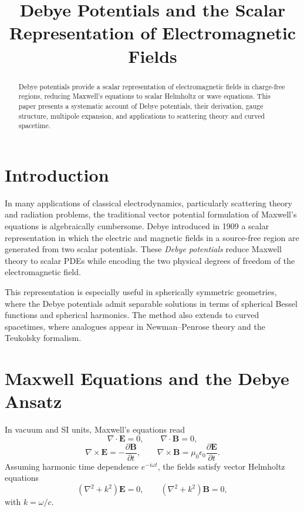 \documentclass[11pt]{article}
\title{Debye Potentials and the Scalar Representation of Electromagnetic Fields}
\author{}
\date{}
\begin{document}
\maketitle

\begin{abstract}
Debye potentials provide a scalar representation of electromagnetic
fields in charge-free regions, reducing Maxwell's equations to scalar
Helmholtz or wave equations. This paper presents a systematic account of
Debye potentials, their derivation, gauge structure, multipole
expansion, and applications to scattering theory and curved spacetime.
\end{abstract}

\section{Introduction}

In many applications of classical electrodynamics, particularly
scattering theory and radiation problems, the traditional vector
potential formulation of Maxwell's equations is algebraically cumbersome.
Debye introduced in 1909 a scalar representation in which the electric
and magnetic fields in a source-free region are generated from two
scalar potentials. These \emph{Debye potentials} reduce Maxwell theory to
scalar PDEs while encoding the two physical degrees of freedom of the
electromagnetic field.

This representation is especially useful in spherically symmetric
geometries, where the Debye potentials admit separable solutions in
terms of spherical Bessel functions and spherical harmonics. The method
also extends to curved spacetimes, where analogues appear in
Newman--Penrose theory and the Teukolsky formalism.

\section{Maxwell Equations and the Debye Ansatz}

In vacuum and SI units, Maxwell's equations read
\begin{equation}
\nabla \!\cdot\! \mathbf{E} = 0, \qquad
\nabla \!\cdot\! \mathbf{B} = 0,
\end{equation}
\begin{equation}
\nabla \!\times\! \mathbf{E} = -\frac{\partial \mathbf{B}}{\partial t},
\qquad
\nabla \!\times\! \mathbf{B}
     = \mu_0 \epsilon_0 \frac{\partial \mathbf{E}}{\partial t}.
\end{equation}
Assuming harmonic time dependence $e^{-i\omega t}$, the fields satisfy
vector Helmholtz equations
\begin{equation}
(\nabla^2 + k^2)\mathbf{E} = 0, \qquad
(\nabla^2 + k^2)\mathbf{B} = 0 ,
\end{equation}
with $k = \omega/c$.
\end{document}
